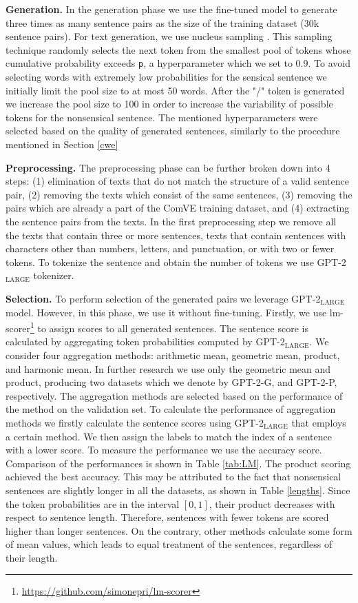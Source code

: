 \documentclass[10pt, a4paper]{article}
\begin{document}
\textbf{Generation.} In the generation phase we use the fine-tuned model to generate three times as many sentence pairs as the size of the training dataset (30k sentence pairs). For text generation, we use nucleus sampling \citep{nucleus}. This sampling technique randomly selects the next token from the smallest pool of tokens whose cumulative probability exceeds \texttt{p}, a hyperparameter which we set to 0.9. To avoid selecting words with extremely low probabilities for the sensical sentence we initially limit the pool size to at most 50 words. After the "/" token is generated we increase the pool size to 100 in order to increase the variability of possible tokens for the nonsensical sentence. The mentioned hyperparameters were selected based on the quality of generated sentences, similarly to the procedure mentioned in Section \ref{cwe}

\textbf{Preprocessing.} The preprocessing phase can be further broken down into 4 steps: (1) elimination of texts that do not match the structure of a valid sentence pair, (2) removing the texts which consist of the same sentences, (3) removing the pairs which are already a part of the ComVE training dataset, and (4) extracting the sentence pairs from the texts. In the first preprocessing step we remove all the texts that contain three or more sentences, texts that contain sentences with characters other than numbers, letters, and punctuation, or with two or fewer tokens. To tokenize the sentence and obtain the number of tokens we use GPT-2$_\text{LARGE}$ tokenizer.

\textbf{Selection.} To perform selection of the generated pairs we leverage GPT-2$_\text{LARGE}$ model. However, in this phase, we use it without fine-tuning. Firstly, we use lm-scorer\footnote{\href{https://github.com/simonepri/lm-scorer}{https://github.com/simonepri/lm-scorer}} to assign scores to all generated sentences. The sentence score is calculated by aggregating token probabilities computed by GPT-2$_\text{LARGE}$. We consider four aggregation methods: arithmetic mean, geometric mean, product, and harmonic mean. In further research we use only the geometric mean and product, producing two datasets which we denote by GPT-2-G, and GPT-2-P, respectively. The aggregation methods are selected based on the performance of the method on the validation set. To calculate the performance of aggregation methods we firstly calculate the sentence scores using GPT-2$_\text{LARGE}$ that employs a certain method. We then assign the labels to match the index of a sentence with a lower score. To measure the performance we use the accuracy score. Comparison of the performances is shown in Table \ref{tab:LM}. The product scoring achieved the best accuracy. This may be attributed to the fact that nonsensical sentences are slightly longer in all the datasets, as shown in Table \ref{lengths}. Since the token probabilities are in the interval $[0, 1]$, their product decreases with respect to sentence length. Therefore, sentences with fewer tokens are scored higher than longer sentences. On the contrary, other methods calculate some form of mean values, which leads to equal treatment of the sentences, regardless of their length.
\end{document}
